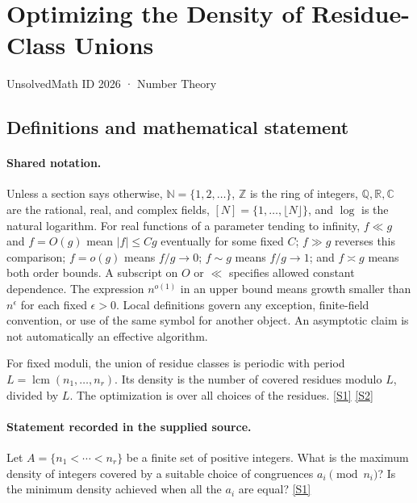 \documentclass[11pt,a4paper]{article}
\newcommand{\N}{\mathbb{N}}
\newcommand{\Z}{\mathbb{Z}}
\newcommand{\Q}{\mathbb{Q}}
\newcommand{\R}{\mathbb{R}}
\newcommand{\C}{\mathbb{C}}
\newcommand{\sref}[2]{\hyperlink{source:#1:#2}{[S#2]}}
\begin{document}

\setcounter{section}{2025}

\section{Optimizing the Density of Residue-Class Unions}\label{2026}

{\small\sffamily UnsolvedMath ID 2026 · Number Theory}

\subsection{Definitions and mathematical statement}

\paragraph{Shared notation.}Unless a section says otherwise, $\N=\{1,2,\ldots\}$,
$\Z$ is the ring of integers, $\Q,\R,\C$ are the rational, real, and complex
fields, $[N]=\{1,\ldots,\lfloor N\rfloor\}$, and $\log$ is the natural
logarithm. For real functions of a parameter tending to infinity,
$f\ll g$ and $f=O(g)$ mean $|f|\leq Cg$ eventually for some fixed $C$;
$f\gg g$ reverses this comparison; $f=o(g)$ means $f/g\to0$;
$f\sim g$ means $f/g\to1$; and $f\asymp g$ means both order bounds.
A subscript on $O$ or $\ll$ specifies allowed constant dependence.
The expression $n^{o(1)}$ in an upper bound means growth smaller than
$n^\epsilon$ for each fixed $\epsilon>0$. Local definitions govern any
exception, finite-field convention, or use of the same symbol for another
object. An asymptotic claim is not automatically an effective algorithm.



For fixed moduli, the union of residue classes is periodic with period $L=\operatorname{lcm}(n_1,\ldots,n_r)$. Its density is the number of covered residues modulo $L$, divided by $L$. The optimization is over all choices of the residues. \sref{2026}{1} \sref{2026}{2}

\paragraph{Statement recorded in the supplied source.}
Let $A=\{n_1<\cdots<n_r\}$ be a finite set of positive integers. What is the maximum density of integers covered by a suitable choice of congruences $a_i\pmod{n_i}$?
Is the minimum density achieved when all the $a_i$ are equal? \sref{2026}{1}
\end{document}

